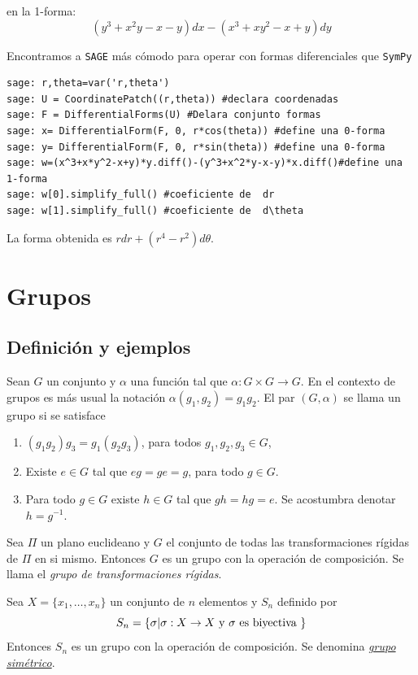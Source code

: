  en la 1-forma:
\[(y^3+x^2y-x-y)dx-(x^3+xy^2-x+y)dy\]



 Encontramos a  \texttt{SAGE} más cómodo para operar con formas diferenciales que \texttt{SymPy}
\begin{lstlisting}
sage: r,theta=var('r,theta')
sage: U = CoordinatePatch((r,theta)) #declara coordenadas
sage: F = DifferentialForms(U) #Delara conjunto formas
sage: x= DifferentialForm(F, 0, r*cos(theta)) #define una 0-forma
sage: y= DifferentialForm(F, 0, r*sin(theta)) #define una 0-forma
sage: w=(x^3+x*y^2-x+y)*y.diff()-(y^3+x^2*y-x-y)*x.diff()#define una 1-forma
sage: w[0].simplify_full() #coeficiente de  dr
sage: w[1].simplify_full() #coeficiente de  d\theta
\end{lstlisting}
La forma obtenida es $rdr+(r^4-r^2)d\theta$.


\section{Grupos}


\subsection{Definición y ejemplos}
\begin{definicion}[Grupo]
Sean $G$ un conjunto y $\alpha$ una función tal que   $\alpha:G\times G\to G$. En el contexto de grupos es más usual la notación  $\alpha(g_1,g_2)=g_1g_2$. El par $(G,\alpha)$ se llama un grupo si se satisface
\begin{enumerate}
\item $(g_1g_2)g_3=g_1(g_2g_3)$, para todos $g_1,g_2,g_3\in G$,
\item Existe $e\in G$ tal que $eg=ge=g$,  para todo $g\in G$.
\item Para todo $g\in G$ existe $h\in G$ tal que $gh=hg=e$. Se acostumbra denotar $h=g^{-1}$.
\end{enumerate}
\end{definicion}




\begin{ejemplo} Sea $\Pi$ un plano euclideano y $G$ el conjunto de todas las transformaciones rígidas de $\Pi$ en si mismo. Entonces $G$ es un grupo con la operación de composición. Se llama el \emph{grupo de transformaciones rígidas}.
 \end{ejemplo}


\begin{ejemplo}  Sea $X=\{x_1,\ldots,x_n\}$ un conjunto de $n$ elementos y $S_n$ definido por
\[S_n=\{\sigma|\sigma:X\to X\hbox{ y }\sigma \hbox{ es biyectiva }\}\]
Entonces $S_n$ es un grupo  con la operación de composición. Se denomina \href{http://es.wikipedia.org/wiki/Grupo_simétrico}{\emph{grupo simétrico}}.
 \end{ejemplo}

